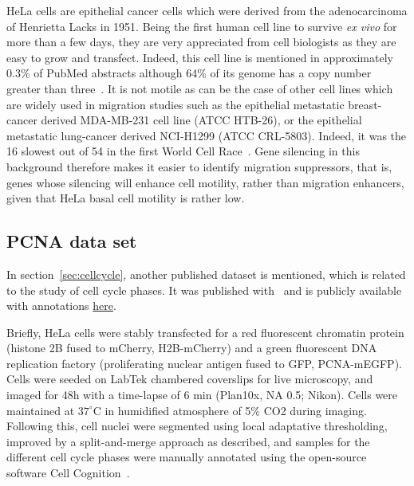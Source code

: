 HeLa cells are epithelial cancer cells which were derived from the adenocarcinoma of Henrietta Lacks in 1951. Being the first human cell line to survive \textit{ex vivo} for more than a few days, they are very appreciated from cell biologists as they are easy to grow and transfect. Indeed, this cell line is mentioned in approximately 0.3\% of PubMed abstracts although 64\% of its genome has a copy number greater than three~\cite{pmid23925245}. It is not motile as can be the case of other cell lines which are widely used in migration studies such as the epithelial metastatic breast-cancer derived MDA-MB-231 cell line (ATCC\up{\textregistered} HTB-26\texttrademark), or the epithelial metastatic lung-cancer derived NCI-H1299 (ATCC\up{\textregistered} CRL-5803\texttrademark). Indeed, it was the 16 slowest out of 54 in the first World Cell Race~\cite{pmid22974990}. Gene silencing in this background therefore makes it easier to identify migration suppressors, that is, genes whose silencing will enhance cell motility, rather than migration enhancers, given that HeLa basal cell motility is rather low.

\subsection{PCNA data set}
In section~\ref{sec:cellcycle}, another published dataset is mentioned, which is related to the study of cell cycle phases. It was published with~\cite{cellcognition} and is publicly available with annotations \href{http://www.cellcognition.org/downloads/data}{here}.

Briefly, HeLa cells were stably transfected for a red fluorescent chromatin protein (histone 2B fused to mCherry, H2B-mCherry) and a green fluorescent DNA replication factory (proliferating nuclear antigen fused to GFP, PCNA-mEGFP). Cells were seeded on LabTek chambered coverslips for live microscopy, and imaged for 48h with a time-lapse of 6 min (Plan10x, NA 0.5; Nikon). Cells were maintained at $37^\circ$C in humidified atmosphere of 5\% CO2 during imaging. Following this, cell nuclei were segmented using local adaptative thresholding, improved by a split-and-merge approach as described, and samples for the different cell cycle phases were manually annotated using the open-source software Cell Cognition~\cite{cellcognition}.
%
